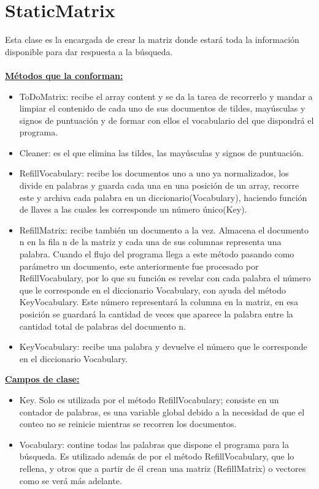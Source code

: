 \documentclass[12pt, letterpaper]{article}
\begin{document}
\section{StaticMatrix}
Esta clase es la encargada de crear la matriz donde estará toda la información disponible para dar respuesta a la búsqueda. \\ \\

\textbf{\underline{Métodos que la conforman: }} 

\begin{itemize}

    \item ToDoMatrix: recibe el array content y se da la tarea de recorrerlo y mandar a limpiar el contenido de cada uno de sus documentos de tildes, mayúsculas y  signos de puntuación  y de formar con ellos el vocabulario del que dispondrá el programa. 
    \item Cleaner: es el que elimina las tildes, las mayúsculas y signos de puntuación. 
    \item RefillVocabulary: recibe los documentos uno a uno ya normalizados, los divide en palabras y guarda cada una en una posición de un array, recorre este y archiva cada palabra en un diccionario(Vocabulary), haciendo función de llaves a las cuales les corresponde un número único(Key).
    \item RefillMatrix: recibe también un documento a la vez. Almacena el documento n en la fila n de la matriz y cada una de sus columnas representa una palabra. Cuando el flujo del programa llega a este método pasando como parámetro un documento, este anteriormente fue procesado por RefillVocabulary, por lo que su función es revelar con cada palabra el número que le corresponde en el diccionario Vocabulary, con ayuda del método KeyVocabulary. Este número representará la columna en la matriz, en esa posición se guardará la cantidad de veces que aparece la palabra entre la cantidad total de palabras del documento n. 
    \item KeyVocabulary: recibe una palabra y devuelve el número que le corresponde en el diccionario Vocabulary. 

\end{itemize}

\textbf{\underline{Campos de clase: }} 

\begin{itemize}

    \item Key. Solo es utilizada por el método RefillVocabulary; consiste en un contador de palabras, es una variable global debido a la necesidad de que el conteo no se reinicie mientras se recorren los documentos.   
    \item Vocabulary: contine todas las palabras que dispone el programa para la búsqueda. Es utilizado además de por el método RefillVocabulary, que lo rellena, y  otros que a partir de él crean una matriz (RefillMatrix) o vectores como se verá más adelante. \\

\end{itemize}
\end{document}
